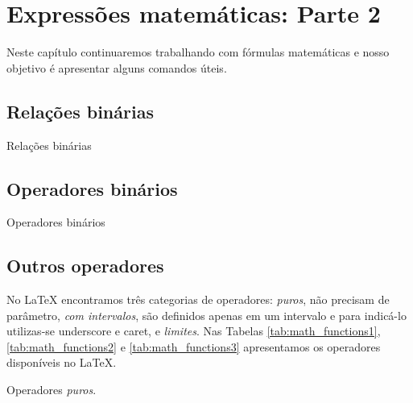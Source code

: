 % 
% 
% 
% 
% 
\chapter{Expressões matemáticas: Parte 2} \label{sch:latex:math2}
Neste capítulo continuaremos trabalhando com fórmulas matemáticas e nosso objetivo é apresentar alguns comandos úteis.

\section{Relações binárias}
\begin{table}[h!tbp]
    \caption{Relações binárias} \centering
    \label{tab:math_binary_relations}
    
\end{table}

\section{Operadores binários}
\begin{table}[h!tb]
    \centering
    \caption{Operadores binários}
    \label{tab:math_binary_operations}
    
\end{table}

\section{Outros operadores}

No LaTeX encontramos três categorias de operadores: \textit{puros}, não precisam de parâmetro, \textit{com intervalos}, são definidos apenas em um intervalo e para indicá-lo utilizas-se underscore e caret, e \textit{limites}. Nas Tabelas \ref{tab:math_functions1}, \ref{tab:math_functions2} e \ref{tab:math_functions3} apresentamos os operadores disponíveis no LaTeX.

\begin{table}[h!tb]
    \centering
    \caption{Operadores \textit{puros}.}
    \label{tab:math_functions1}
    
\end{table}

